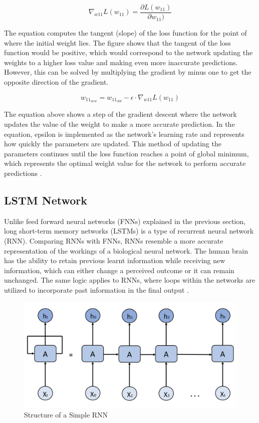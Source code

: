 \begin{equation}
\nabla_{w11} L(w_{11}) = \frac{\partial L(w_{11})}{\partial w_{11})}
\end{equation}

\indent\newline
The equation computes the tangent (slope) of the loss function for the point of where the initial weight lies. The figure shows that the tangent of the loss function would be positive, which would correspond to the network updating the weights to a higher loss value and making even more inaccurate predictions. However, this can be solved by multiplying the gradient by minus one to get the opposite direction of the gradient.  

\begin{equation}
w_{11_{new}} = w_{11_{old}} - \epsilon \cdot \nabla_{w11} L(w_{11})
\end{equation}

\indent\newline
The equation above shows a step of the gradient descent where the network updates the value of the weight to make a more accurate prediction. In the equation, epsilon is implemented as the network’s learning rate and represents how quickly the parameters are updated. This method of updating the parameters continues until the loss function reaches a point of global minimum, which represents the optimal weight value for the network to perform accurate predictions \cite{opper}.  

\subsection{LSTM Network}
Unlike feed forward neural networks (FNNs) explained in the previous section, long short-term memory networks (LSTMs) is a type of recurrent neural network (RNN). Comparing RNNs with FNNs, RNNs resemble a more accurate representation of the workings of a biological neural network. The human brain has the ability to retain previous learnt information while receiving new information, which can either change a perceived outcome or it can remain unchanged. The same logic applies to RNNs, where loops within the networks are utilized to incorporate past information in the final output \cite{adu}. 

\indent\newline 
\begin{figure}[H]
\centering
\includegraphics [scale=0.32,angle=360]{figures/rnn.png}
\caption{Structure of a Simple RNN}
\label{fig:rnn}
\end{figure}

